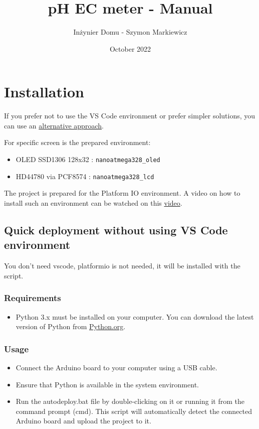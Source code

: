 \documentclass{article}
\title{pH EC meter - Manual}
\author{Inżynier Domu - Szymon Markiewicz}
\date{October 2022}
\begin{document}
\maketitle
\tableofcontents

\section{Installation}
If you prefer not to use the VS Code environment or prefer simpler solutions, you can use an \href{#quick-deployment-without-using-vs-code-environment}{alternative approach}.

For specific screen is the prepared environment:
\begin{itemize}
    \item OLED SSD1306 128x32 : \texttt{nanoatmega328\_oled}
    \item HD44780 via PCF8574 : \texttt{nanoatmega328\_lcd}
\end{itemize}

The project is prepared for the Platform IO environment. A video on how to install such an environment can be watched on this \href{https://youtu.be/Em9NuebT2Kc}{video}.

\subsection{Quick deployment without using VS Code environment}
You don't need vscode, platformio is not needed, it will be installed with the script.

\subsubsection{Requirements}
\begin{itemize}
    \item Python 3.x must be installed on your computer. You can download the latest version of Python from \href{https://www.python.org}{Python.org}.
\end{itemize}

\subsubsection{Usage}
\begin{itemize}
    \item Connect the Arduino board to your computer using a USB cable.
    \item Ensure that Python is available in the system environment.
    \item Run the autodeploy.bat file by double-clicking on it or running it from the command prompt (cmd). This script will automatically detect the connected Arduino board and upload the project to it.
\end{itemize}
\end{document}
